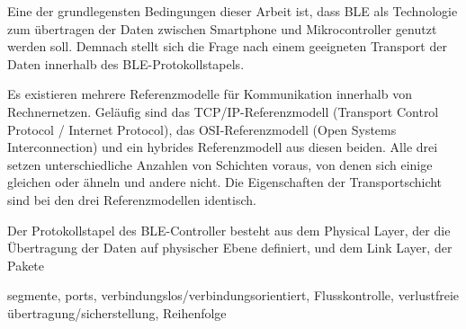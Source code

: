 Eine der grundlegensten Bedingungen dieser Arbeit ist, dass BLE als Technologie zum übertragen der Daten zwischen Smartphone und Mikrocontroller genutzt werden soll. Demnach stellt sich die Frage nach einem geeigneten Transport der Daten innerhalb des BLE-Protokollstapels.

Es existieren mehrere Referenzmodelle für Kommunikation innerhalb von Rechnernetzen. Geläufig sind das TCP/IP-Referenzmodell (Transport Control Protocol / Internet Protocol), das OSI-Referenzmodell (Open Systems Interconnection) und ein hybrides Referenzmodell aus diesen beiden. Alle drei setzen unterschiedliche Anzahlen von Schichten voraus, von denen sich einige gleichen oder ähneln und andere nicht. Die Eigenschaften der Transportschicht sind bei den drei Referenzmodellen identisch.

Der Protokollstapel des BLE-Controller besteht aus dem Physical Layer, der die Übertragung der Daten auf physischer Ebene definiert, und dem Link Layer, der Pakete

segmente, ports, verbindungslos/verbindungsorientiert, Flusskontrolle, verlustfreie übertragung/sicherstellung, Reihenfolge
